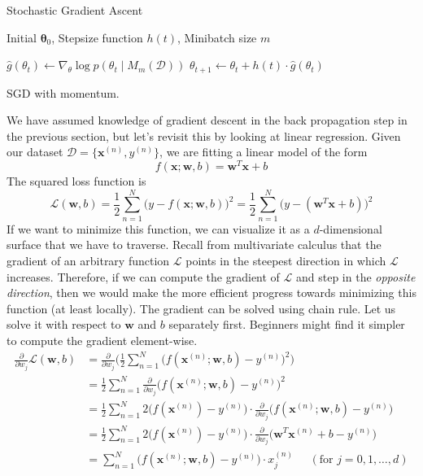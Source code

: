   \begin{algorithm}
    \caption{Stochastic Gradient Ascent}\label{alg:sgd}
    \begin{algorithmic}

    \Require Initial $\boldsymbol{\theta}_0$, Stepsize function $h(t)$, Minibatch size $m$

        \State $\hat{g}(\theta_t) \gets \nabla_\theta \log{p(\theta_t \mid M_m(\mathcal{D}))}$
        \State $\theta_{t+1} \gets \theta_t + h(t) \cdot \hat{g}(\theta_t)$
    \EndFor

    \end{algorithmic}
  \end{algorithm}

  SGD with momentum. 

  We have assumed knowledge of gradient descent in the back propagation step in the previous section, but let's revisit this by looking at linear regression. Given our dataset $\mathcal{D} = \{\mathbf{x}^(n), y^{(n)}\}$, we are fitting a linear model of the form 
  \begin{equation}
    f(\mathbf{x}; \mathbf{w}, b) = \mathbf{w}^T \mathbf{x} + b
  \end{equation} 
  The squared loss function is 
  \begin{equation}
    \mathcal{L}(\mathbf{w}, b) = \frac{1}{2} \sum_{n=1}^N \big( y - f(\mathbf{x}; \mathbf{w}, b) \big)^2 = \frac{1}{2} \sum_{n=1}^N \big( y - (\mathbf{w}^T \mathbf{x} + b) \big)^2  
  \end{equation}
  If we want to minimize this function, we can visualize it as a $d$-dimensional surface that we have to traverse. Recall from multivariate calculus that the gradient of an arbitrary function $\mathcal{L}$ points in the steepest direction in which $\mathcal{L}$ increases. Therefore, if we can compute the gradient of $\mathcal{L}$ and step in the \textit{opposite direction}, then we would make the more efficient progress towards minimizing this function (at least locally). The gradient can be solved using chain rule. Let us solve it with respect to $\mathbf{w}$ and $b$ separately first. Beginners might find it simpler to compute the gradient element-wise. 
  \begin{align}
    \frac{\partial}{\partial w_j} \mathcal{L}(\mathbf{w}, b) 
    & = \frac{\partial}{\partial w_j} \bigg(\frac{1}{2} \sum_{n=1}^N \Big( f (\mathbf{x}^{(n)}; \mathbf{w}, b) - y^{(n)} \Big)^2 \bigg) \\
    & = \frac{1}{2} \sum_{n=1}^N \frac{\partial}{\partial w_j} \Big( f(\mathbf{x}^{(n)}; \mathbf{w}, b) - y^{(n)}\Big)^2 \\
    & = \frac{1}{2} \sum_{n=1}^N 2 \Big( f(\mathbf{x}^{(n)}) - y^{(n)}\Big) \cdot \frac{\partial}{\partial w_j} \big( f(\mathbf{x}^{(n)}; \mathbf{w}, b) - y^{(n)} \big) \\
    & = \frac{1}{2} \sum_{n=1}^N 2 \Big( f(\mathbf{x}^{(n)}) - y^{(n)}\Big) \cdot \frac{\partial}{\partial w_j} \big( \mathbf{w}^T \mathbf{x}^{(n)} + b - y^{(n)} \big) \\
    & = \sum_{n=1}^N \big( f(\mathbf{x}^{(n)}; \mathbf{w}, b) - y^{(n)}\big) \cdot x_j^{(n)} \;\;\;\;\;(\text{for } j = 0, 1, \ldots, d)
  \end{align}
